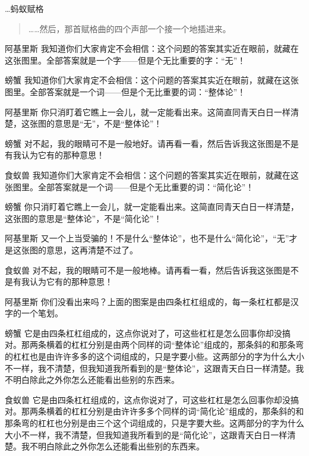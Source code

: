 
\begin{dialog}{…蚂蚁赋格}

\begin{quote}
……然后，那首赋格曲的四个声部一个接一个地插进来。
\end{quote}

\begin{dialogue}

\item[阿基里斯]我知道你们大家肯定不会相信：这个问题的答案其实近在眼前，就藏在这张图里。全部答案就是一个字——但是个无比重要的字：“无”！

\item[螃蟹]我知道你们大家肯定不会相信：这个问题的答案其实近在眼前，就藏在这张图里。全部答案就是一个词——但是个无比重要的词：“整体论”！

\item[阿基里斯]你只消盯着它瞧上一会儿，就一定能看出来。这简直同青天白日一样清楚，这张图的意思是“无”，不是“整体论”！

\item[螃蟹]对不起，我的眼睛可不是一般地好。请再看一看，然后告诉我这张图是不是有我认为它有的那种意思！

\item[食蚁兽]我知道你们大家肯定不会相信：这个问题的答案其实近在眼前，就藏在这张图里。全部答案就是一个词——但是个无比重要的词：“简化论”！

\item[螃蟹]你只消盯着它瞧上一会儿，就一定能看出来。这简直同青天白日一样清楚，这张图的意思是“整体论”，不是“简化论”！

\item[阿基里斯]又一个上当受骗的！不是什么“整体论”，也不是什么“简化论”，“无”才是这张图的意思，这再清楚不过了。

\item[食蚁兽]对不起，我的眼睛可不是一般地棒。请再看一看，然后告诉我这张图是不是有我认为它有的那种意思！

\item[阿基里斯]你们没看出来吗？上面的图案是由四条杠杠组成的，每一条杠杠都是汉字的一个笔划。

\item[螃蟹]它是由四条杠杠组成的，这点你说对了，可这些杠杠是怎么回事你却没搞对。那两条横着的杠杠分别是由两个同样的词“整体论”组成的，那条斜的和那条弯的杠杠也是由许许多多的这个词组成的，只是字要小些。这两部分的字为什么大小不一样，我不清楚，但我知道我所看到的是“整体论”，这跟青天白日一样清楚。我不明白除此之外你怎么还能看出些别的东西来。

\item[食蚁兽]它是由四条杠杠组成的，这点你说对了，可这些杠杠是怎么回事你却没搞对。那两条横着的杠杠分别是由许许多多个同样的词“简化论”组成的，那条斜的和那条弯的杠杠也分别是由三个这个词组成的，只是字要大些。这两部分的字为什么大小不一样，我不清楚，但我知道我所看到的是“简化论”，这跟青天白日一样清楚。我不明白除此之外你怎么还能看出些别的东西来。


\end{dialogue}
\end{dialog}
